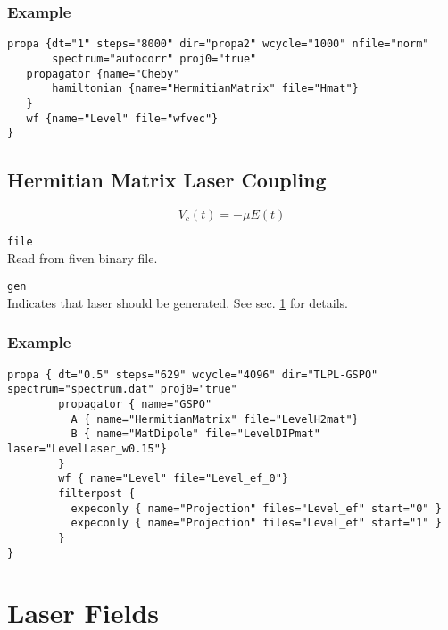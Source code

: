 \documentclass[a4paper,12pt]{scrbook}
\newcommand{\option}[2]{\item \texttt{#1}\\ #2}
\begin{document}
\subsubsection*{Example}
\begin{verbatim}
propa {dt="1" steps="8000" dir="propa2" wcycle="1000" nfile="norm"
       spectrum="autocorr" proj0="true"
   propagator {name="Cheby"
       hamiltonian {name="HermitianMatrix" file="Hmat"}
   }
   wf {name="Level" file="wfvec"}
} 
\end{verbatim}


\subsection{Hermitian Matrix Laser Coupling}
\begin{equation}
 V_c(t) = -\mu E(t)
\end{equation}

\begin{options}
 \option{file}{Read from fiven binary file.}
 \option{gen}{Indicates that laser should be generated. See sec. \ref{sec:LaserFields} for details.}
\end{options}

\subsubsection*{Example}
\begin{verbatim}
propa { dt="0.5" steps="629" wcycle="4096" dir="TLPL-GSPO" spectrum="spectrum.dat" proj0="true"
        propagator { name="GSPO"
          A { name="HermitianMatrix" file="LevelH2mat"}
          B { name="MatDipole" file="LevelDIPmat" laser="LevelLaser_w0.15"}
        }
        wf { name="Level" file="Level_ef_0"}
        filterpost {
          expeconly { name="Projection" files="Level_ef" start="0" }
          expeconly { name="Projection" files="Level_ef" start="1" }
        }
} 
\end{verbatim}

\section{Laser Fields}
\label{sec:LaserFields}
\end{document}
